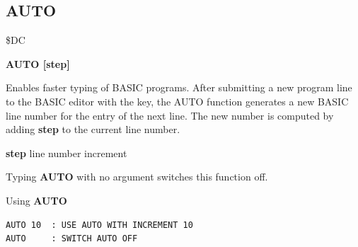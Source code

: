 
\newpage
\subsection{AUTO}
\begin{description}[leftmargin=2cm,style=nextline]
\item [Token:] \$DC
\item [Format:]
  {\bf AUTO [step]}
\item [Usage:] Enables faster typing of BASIC programs.
  After submitting a new program line to the BASIC editor with
  the  key, the AUTO function generates a new BASIC line
  number for the entry of the next line. The new number is
  computed by adding {\bf step} to the current line number.

  {\bf step} line number increment

  Typing {\bf AUTO} with no argument switches this function off.

\item [Examples:] Using {\bf AUTO}
\begin{tcolorbox}[colback=black,coltext=white]
\verbatimfont{\codefont}
\begin{verbatim}
AUTO 10  : USE AUTO WITH INCREMENT 10
AUTO     : SWITCH AUTO OFF
\end{verbatim}
\end{tcolorbox}
\end{description}


\newpage
